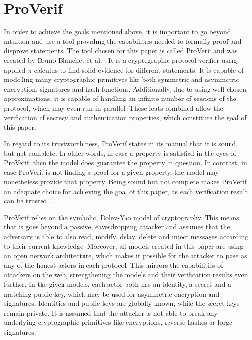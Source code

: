 \documentclass[11pt,twoside,a4paper,openright]{book}
\begin{document}
\chapter{ProVerif}
\label{proverif}

In order to achieve the goals mentioned above, it is important to go beyond intuition and use a tool providing the capabilities needed to formally proof and disprove statements. The tool chosen for this paper is called ProVerif and was created by Bruno Blanchet et al. \cite{proverif}. It is a cryptographic protocol verifier using applied $\pi$-calculus to find solid evidence for different statements. It is capable of modelling many cryptographic primitives like both symmetric and asymmetric encryption, signatures and hash functions. Additionally, due to using well-chosen approximations, it is capable of handling an infinite number of sessions of the protocol, which may even run in parallel. These feats combined allow the verification of secrecy and authentication properties, which constitute the goal of this paper.

In regard to its trustworthiness, ProVerif states in its manual that it is sound, but not complete. In other words, in case a property is satisfied in the eyes of ProVerif, then the model does guarantee the property in question. In contrast, in case ProVerif is not finding a proof for a given property, the model may nonetheless provide that property. Being sound but not complete makes ProVerif an adequate choice for achieving the goal of this paper, as each verification result can be trusted \cite{proverifManual}.

ProVerif relies on the symbolic, Dolev-Yao model of cryptography. This means that is goes beyond a passive, eavesdropping attacker and assumes that the adversary is able to also read, modify, delay, delete and inject messages according to their current knowledge. Moreover, all models created in this paper are using an open network architecture, which makes it possible for the attacker to pose as any of the honest actors in each protocol. This mirrors the capabilities of attackers on the web, strengthening the models and their verification results even further. In the given models, each actor both has an identity, a secret and a matching public key, which may be used for asymmetric encryption and signatures. Identities and public keys are globally known, while the secret keys remain private. It is assumed that the attacker is not able to break any underlying cryptographic primitives like encryptions, reverse hashes or forge signatures.
\end{document}
